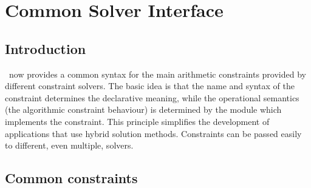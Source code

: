 %
% 
% 
% 
% 



\chapter{Common Solver Interface}

\section{Introduction}
\eclipse\ now provides a common syntax for the main arithmetic constraints
provided by different constraint solvers.
The basic idea is that the name and syntax of the constraint determines the
declarative meaning, while the operational semantics (the algorithmic
constraint behaviour) is determined by the module which implements the
constraint.
This principle simplifies the development of applications that use
hybrid solution methods. Constraints can be passed easily to different,
even multiple, solvers.


\section{Common constraints}

